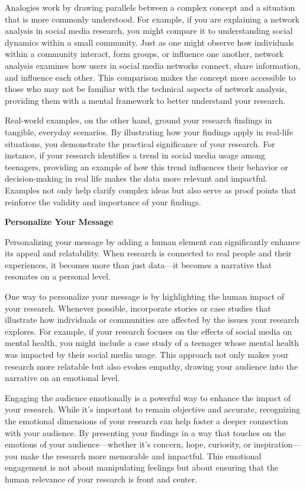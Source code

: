 \documentclass[
]{book}
\begin{document}
Analogies work by drawing parallels between a complex concept and a situation that is more commonly understood. For example, if you are explaining a network analysis in social media research, you might compare it to understanding social dynamics within a small community. Just as one might observe how individuals within a community interact, form groups, or influence one another, network analysis examines how users in social media networks connect, share information, and influence each other. This comparison makes the concept more accessible to those who may not be familiar with the technical aspects of network analysis, providing them with a mental framework to better understand your research.

Real-world examples, on the other hand, ground your research findings in tangible, everyday scenarios. By illustrating how your findings apply in real-life situations, you demonstrate the practical significance of your research. For instance, if your research identifies a trend in social media usage among teenagers, providing an example of how this trend influences their behavior or decision-making in real life makes the data more relevant and impactful. Examples not only help clarify complex ideas but also serve as proof points that reinforce the validity and importance of your findings.

\textbf{Personalize Your Message}

Personalizing your message by adding a human element can significantly enhance its appeal and relatability. When research is connected to real people and their experiences, it becomes more than just data---it becomes a narrative that resonates on a personal level.

One way to personalize your message is by highlighting the human impact of your research. Whenever possible, incorporate stories or case studies that illustrate how individuals or communities are affected by the issues your research explores. For example, if your research focuses on the effects of social media on mental health, you might include a case study of a teenager whose mental health was impacted by their social media usage. This approach not only makes your research more relatable but also evokes empathy, drawing your audience into the narrative on an emotional level.

Engaging the audience emotionally is a powerful way to enhance the impact of your research. While it's important to remain objective and accurate, recognizing the emotional dimensions of your research can help foster a deeper connection with your audience. By presenting your findings in a way that touches on the emotions of your audience---whether it's concern, hope, curiosity, or inspiration---you make the research more memorable and impactful. This emotional engagement is not about manipulating feelings but about ensuring that the human relevance of your research is front and center.
\end{document}
